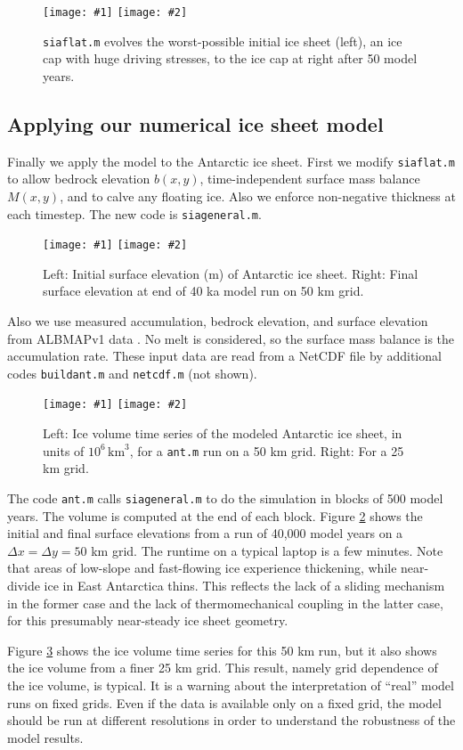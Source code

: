 \documentclass[titlepage,a4paper,final,12pt]{scrartcl}
\newcommand{\twofigsizes}[5]{
\begin{figure}[ht]
\centering
\texttt{[image: \#1]} \quad
\texttt{[image: \#2]}
\caption{#3}
\label{fig:#1}
\end{figure}}
\newcommand{\twofig}[3]{\twofigsizes{#1}{#2}{#3}{2.5in}{2.5in}}
\begin{document}
\twofig{roughinitial}{roughfinal}{\texttt{siaflat.m} evolves the worst-possible initial ice sheet (left), an ice cap with huge driving stresses, to the ice cap at right after 50 model years.}


\subsection{Applying our numerical ice sheet model}

Finally we apply the model to the Antarctic ice sheet.  First we modify \texttt{siaflat.m} to allow bedrock elevation $b(x,y)$, time-independent surface mass balance $M(x,y)$, and to calve any floating ice.  Also we enforce non-negative thickness at each timestep.  The new code is \texttt{siageneral.m}.

\twofigsizes{antinitial}{antfinal}{Left: Initial surface elevation (m) of Antarctic ice sheet.  Right: Final surface elevation at end of 40 ka model run on 50 km grid.}{2.55in}{3.2in}

Also we use measured accumulation, bedrock elevation, and surface elevation from ALBMAPv1 data \cite{LeBrocqetal2010}.  No melt is considered, so the surface mass balance is the accumulation rate.  These input data are read from a NetCDF file by additional codes \texttt{buildant.m} and \texttt{netcdf.m} (not shown).

\twofig{antvol}{antvol25km}{Left: Ice volume time series of the modeled Antarctic ice sheet, in units of $10^6 \, \text{km}^3$, for a \texttt{ant.m} run on a 50 km grid.  Right:  For a 25 km grid.}

The code \texttt{ant.m} calls \texttt{siageneral.m} to do the simulation in blocks of 500 model years.  The volume is computed at the end of each block.  Figure \ref{fig:antinitial} shows the initial and final surface elevations from a run of 40,000 model years on a $\Delta x = \Delta y = 50$ km grid.  The runtime on a typical laptop is a few minutes.  Note that areas of low-slope and fast-flowing ice experience thickening, while near-divide ice in East Antarctica thins.  This reflects the lack of a sliding mechanism in the former case and the lack of thermomechanical coupling in the latter case, for this presumably near-steady ice sheet geometry.

Figure \ref{fig:antvol} shows the ice volume time series for this 50 km run, but it also shows the ice volume from a finer 25 km grid.  This result, namely grid dependence of the ice volume, is typical.  It is a warning about the interpretation of ``real'' model runs on fixed grids.  Even if the data is available only on a fixed grid, the model should be run at different resolutions in order to understand the robustness of the model results.
\end{document}
